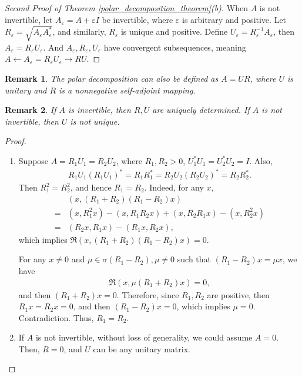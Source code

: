 \documentclass[10pt]{book}
\newtheorem{remark}{Remark}[chapter]
\theoremstyle{definition}
\numberwithin{equation}{chapter}
\begin{document}
\medskip

\begin{proof}[Second Proof of Theorem \ref{polar_decomposition_theorem}(b)]
When $A$ is not invertible, let $A_\varepsilon = A + \varepsilon I$ be invertible, where $\varepsilon$ is arbitrary and positive. Let $R_\varepsilon = \sqrt{A_\varepsilon A_\varepsilon^*}$, and similarly, $R_\varepsilon$ is unique and positive. Define $U_\varepsilon = R_\varepsilon^{-1} A_\varepsilon$, then $A_\varepsilon = R_\varepsilon U_\varepsilon$. And $A_\varepsilon, R_\varepsilon, U_\varepsilon$ have convergent subsequences, meaning $A \gets A_\varepsilon = R_\varepsilon U_\varepsilon \to RU$.
\end{proof}

\medskip

\begin{remark}
The polar decomposition can also be defined as $A = UR$, where $U$ is unitary and $R$ is a nonnegative self-adjoint mapping.
\end{remark}

\medskip

\begin{remark}
If $A$ is invertible, then $R, U$ are uniquely determined. If $A$ is not invertible, then $U$ is not unique.
\end{remark}
\begin{proof}
~\begin{enumerate}[label=(\alph*)]
    \item Suppose $A = R_1U_1 = R_2 U_2$, where $R_1, R_2 > 0$, $U_1^* U_1 = U_2^* U_2 = I$. Also,
    \begin{align*}
        R_1 U_1 \left(R_1 U_1\right)^* = R_1 R_1^* = R_2 U_2 \left(R_2 U_2\right)^* = R_2 R_2^*.
    \end{align*}
    Then $R_1^2 = R_2^2$, and hence $R_1 = R_2$. Indeed, for any $x$, 
    \begin{align*}
        & \left(x, (R_1 + R_2)(R_1 - R_2)x\right) \\
        = & (x, R_1^2x) - (x, R_1 R_2 x) + (x, R_2 R_1 x) - (x, R_2^2x) \\
        = & (R_2 x, R_1 x) - (R_1 x, R_2 x),
    \end{align*}
    which implies $\Re\left(x, (R_1 + R_2)(R_1 - R_2)x\right) = 0$. 
    
    For any $x \neq 0$ and $\mu \in \sigma(R_1 - R_2), \mu \neq 0$ such that $(R_1 - R_2)x = \mu x$, we have
    \begin{align*}
        \Re\left(x, \mu (R_1 + R_2) x\right) = 0,
    \end{align*}
    and then $(R_1 + R_2) x = 0$. Therefore, since $R_1, R_2$ are positive, then $R_1 x = R_2 x = 0$, and then $(R_1 - R_2)x = 0$, which implies $\mu = 0$. Contradiction. Thus, $R_1 = R_2$.
    
    \item If $A$ is not invertible, without loss of generality, we could assume $A = 0$. Then, $R = 0$, and $U$ can be any unitary matrix.
\end{enumerate}
\end{proof}
\end{document}

